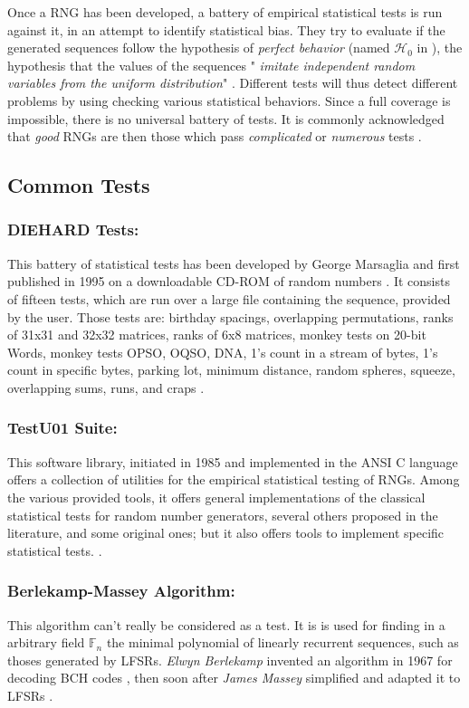 \documentclass{llncs}
\begin{document}
Once a RNG has been developed, a battery of empirical statistical tests is run against it, in an attempt to identify statistical bias. They try to evaluate if the generated sequences follow the hypothesis of \emph{perfect behavior} (named $\mathcal{H}_0$ in \cite{lecu}), the hypothesis that the values of the sequences "\textit{ imitate independent random variables from the uniform distribution}" \cite{lecu}. Different tests will thus detect different problems by using checking various statistical behaviors. Since a full coverage is impossible, there is no universal battery of tests. It is commonly acknowledged that \textit{good} RNGs are then those which pass \textit{complicated} or \textit{numerous} tests \cite{ritt,lecu}. 


\subsection{Common Tests}


\subsubsection{DIEHARD Tests:} 

This battery of statistical tests has been developed by George Marsaglia and first published in 1995 on a downloadable CD-ROM of random numbers \cite{marsa}. It consists of fifteen tests, which are run over a large file containing the sequence, provided by the user. Those tests are: birthday spacings, overlapping permutations, ranks of 31x31 and 32x32 matrices, ranks of 6x8 matrices, monkey tests on 20-bit Words, monkey tests OPSO, OQSO, DNA, 1's count in a stream of bytes, 1's count in specific bytes, parking lot, minimum distance, random spheres, squeeze, overlapping sums, runs, and craps \cite{soto}.

\subsubsection{TestU01 Suite:}
This software library, initiated in 1985 and implemented in the ANSI C language offers a collection of utilities for the empirical statistical testing of RNGs. Among the various provided tools, it offers general implementations of the classical statistical tests for random number generators, several others proposed in the literature, and some original ones; but it also offers tools to implement specific statistical tests. \cite{lecu}.

\subsubsection{Berlekamp-Massey Algorithm:} This algorithm can't really be considered as a test. It is is used for finding in a arbitrary field $\mathbb{F}_n$ the minimal polynomial of linearly recurrent sequences, such as thoses generated by LFSRs. \emph{Elwyn Berlekamp} invented an algorithm in 1967 for decoding BCH codes \cite{berle}, then soon after \emph{James Massey} simplified and adapted it to LFSRs \cite{mass}.
\end{document}
